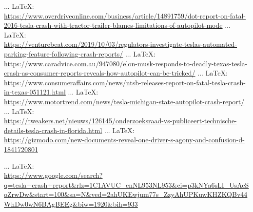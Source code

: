 \begin{thebibliography}{99}
{{{{{{{							 ... \LaTeX:\\ \url{https://www.overdriveonline.com/business/article/14891759/dot-report-on-fatal-2016-tesla-crash-with-tractor-trailer-blames-limitations-of-autopilot-mode}
							 ... \LaTeX:\\ \url{https://venturebeat.com/2019/10/03/regulators-investigate-teslas-automated-parking-feature-following-crash-reports/}
							 ... \LaTeX:\\ \url{https://www.caradvice.com.au/947080/elon-musk-responds-to-deadly-texas-tesla-crash-as-consumer-reports-reveals-how-autopilot-can-be-tricked/}
							 ... \LaTeX:\\ \url{https://www.consumeraffairs.com/news/ntsb-releases-report-on-fatal-tesla-crash-in-texas-051121.html}
							 ... \LaTeX:\\ \url{https://www.motortrend.com/news/tesla-michigan-state-autopilot-crash-report/}
							 ... \LaTeX:\\ \url{https://tweakers.net/nieuws/126145/onderzoeksraad-vs-publiceert-technische-details-tesla-crash-in-florida.html}
							 ... \LaTeX:\\ \url{https://gizmodo.com/new-documents-reveal-one-driver-s-agony-and-confusion-d-1841720801}
							
							
							 ... \LaTeX:\\ \url{https://www.google.com/search?q=tesla+crash+report&rlz=1C1AVUC_enNL953NL953&ei=p3kNYa6sLI_UsAeSoZrwDw&start=100&sa=N&ved=2ahUKEwjum77s_ZzyAhUPKuwKHZKQBv44WhDw0wN6BAgBEEg&biw=1920&bih=933}
							
							
							
							
}}}}}}}
\end{thebibliography}
